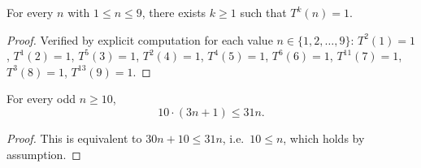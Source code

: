 
\begin{lemma}\label{lemma:small_cases}\leanok
For every $n$ with $1 \le n \le 9$, there exists $k \ge 1$ such that $T^k(n) = 1$.
\end{lemma}
\begin{proof}\leanok
Verified by explicit computation for each value $n \in \{1, 2, \ldots, 9\}$:
$T^2(1)=1$, $T^1(2)=1$, $T^5(3)=1$, $T^2(4)=1$, $T^4(5)=1$, $T^6(6)=1$, $T^{11}(7)=1$, $T^3(8)=1$, $T^{13}(9)=1$.
\end{proof}

\begin{lemma}\label{lemma:T_odd_upper}\leanok
For every odd $n \ge 10$,
\[
  10 \cdot (3n + 1) \le 31 n.
\]
\end{lemma}
\begin{proof}\leanok
This is equivalent to $30n + 10 \le 31n$, i.e.\ $10 \le n$, which holds by assumption.
\end{proof}

